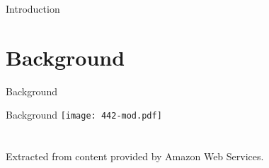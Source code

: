 \documentclass[t,handout]{beamer}   %
\begin{document}
\begin{frame}{Introduction}
\end{frame}

\section{Background}

\begin{frame}{Background}
\end{frame}

\begin{frame}{Background}
 	\texttt{[image: 442-mod.pdf]} \\~\\~\\
 	{\tiny Extracted from content provided by Amazon Web Services\cite{Aws:15}.}
\end{frame}
\end{document}
